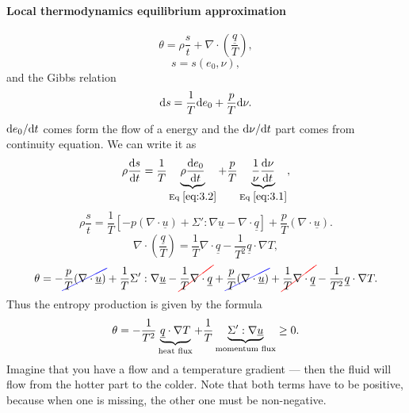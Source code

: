 \documentclass[11pt,oneside]{book}
\renewcommand{\vec}[1]{\underline{#1}}
\theoremstyle{definition} %
\theoremstyle{plain} %
\theoremstyle{remark} %
\theoremstyle{underline}
\newcommand\Ccancel[2][black]{
    \let\OldcancelColor\CancelColor
    \renewcommand\CancelColor{\color{#1}}
    \cancel{#2}
    \renewcommand\CancelColor{\OldcancelColor}
}
\begin{document}
  \paragraph{Local thermodynamics equilibrium approximation}
  \begin{displaymath}
    \theta = \rho \dfrac{s}{t} + \nabla \cdot \left( \frac{\vec q}{T} \right),
  \end{displaymath}
  \begin{displaymath}
    s = s(e_0, \nu),
  \end{displaymath}
  and the Gibbs relation
  \begin{displaymath}
    \mathrm{d} s = \frac{1}{T}\mathrm{d} e_0 + \frac{p}{T} \mathrm{d} \nu.
  \end{displaymath}
  $\mathrm{d} e_0/\mathrm{d} t$ comes form the flow of a energy and the $\mathrm{d} \nu / \mathrm{d} t$ part comes from continuity equation.
  We can write it as
  \begin{displaymath}
    \rho \frac{\mathrm{d} s}{\mathrm{d} t} = \frac{1}{T} \underbrace{\rho \frac{\mathrm{d} e_0}{\mathrm{d} t}}_{\textrm{Eq }\ref{eq:3.2}}
    + \frac{p}{T} \underbrace{\frac{1}{\nu} \frac{\mathrm{d} \nu }{\mathrm{d} t}}_{\textrm{Eq } \ref{eq:3.1}},
  \end{displaymath}
  \begin{displaymath}
    \rho \dfrac{s}{t} = \frac{1}{T} \left[ - p (\nabla \cdot \vec u) + \Sigma' : \nabla \vec u - \nabla \cdot \vec q \right]
    + \frac{p}{T} (\nabla \cdot \vec u).
  \end{displaymath}
  \begin{displaymath}
    \nabla \cdot \left( \frac{\vec q }{T} \right) = \frac{1}{T} \nabla \cdot \vec q - \frac{1}{T^2} \vec q \cdot \nabla T,
  \end{displaymath}
  \begin{displaymath}
    \theta =  -\Ccancel[blue]{\frac{p}{T} (\nabla \cdot \vec u)} + \frac{1}{T} \Sigma' : \nabla \vec u -\Ccancel[red]{ \frac{1}{T} \nabla \cdot \vec q}
    + \Ccancel[blue]{\frac{p}{T} (\nabla \cdot \vec u)} + \Ccancel[red]{\frac{1}{T} \nabla \cdot \vec q} - \frac{1}{T^2} \vec q \cdot \nabla T.
  \end{displaymath}
  Thus the entropy production is given by the formula
  \begin{displaymath}
    \theta = - \frac{1}{T^2} \underbrace{\vec q \cdot \nabla T}_{\tm{heat flux}} + \frac{1}{T} \underbrace{\Sigma' : \nabla \vec u}_{\tm{momentum flux}} \geq 0.
  \end{displaymath}
  Imagine that you have a flow and a temperature gradient --- then the fluid will flow from the hotter part to the colder.
  Note that both terms have to be positive, because when one is missing, the other one must be non-negative.
\end{document}
